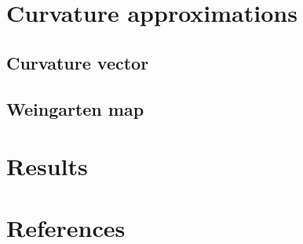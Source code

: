       
\section{Curvature approximations}
  \subsection{Curvature vector} \label{secCurvatureVector}
  \subsection{Weingarten map} \label{secWeingarten}

\section{Results}

\section*{References}




